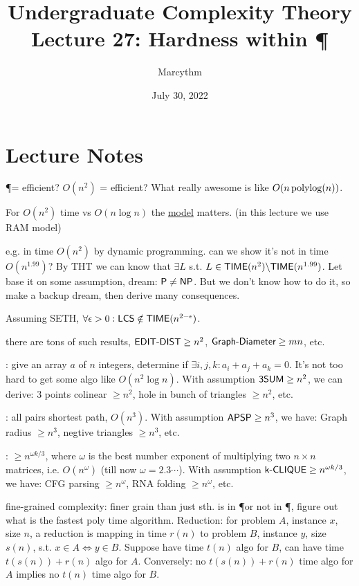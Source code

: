 \documentclass{article}
\title{Undergraduate Complexity Theory \\ Lecture 27: Hardness within \P}
\author{Marcythm}
\date{July 30, 2022}
\begin{document}
\maketitle{}

\section{Lecture Notes}

\P = efficient? \(O(n^2)\) = efficient? What really awesome is like \(O(n \operatorname{polylog}(n))\).

\begin{remark}
  For \(O(n^2)\) time vs \(O(n \log n)\) the \ul{model} matters. (in this lecture we use RAM model)
\end{remark}

e.g.  in time \(O(n^2)\) by dynamic programming. can we show it's not in time \(O(n^{1.99})\)? By THT we can know that \(\exists L\) s.t. \(L \in \text{\sf TIME}(n^2) \backslash \text{\sf TIME}(n^{1.99})\). Let base it on some assumption, dream: \(\text{\sf P} \neq \text{\sf NP}\). But we don't know how to do it, so make a backup dream, then derive many consequences.

\begin{theorem}[2010's]
  Assuming SETH, \(\forall \epsilon>0: \text{\sf LCS} \notin \text{\sf TIME}(n^{2-\epsilon})\).
\end{theorem}

there are tons of such results, \(\text{\sf EDIT-DIST} \geq n^2\), \(\text{\sf Graph-Diameter} \geq mn\), etc.

: give an array \(a\) of \(n\) integers, determine if \(\exists i, j, k: a_i + a_j + a_k = 0\). It's not too hard to get some algo like \(O(n^2 \log n)\). With assumption \(\text{\sf 3SUM} \geq n^2\), we can derive: 3 points colinear \(\geq n^2\), hole in bunch of triangles \(\geq n^2\), etc.

: all pairs shortest path, \(O(n^3)\). With assumption \(\text{\sf APSP} \geq n^3\), we have: Graph radius \(\geq n^3\), negtive triangles \(\geq n^3\), etc.

: \(\geq n^{\omega k/3}\), where \(\omega\) is the best number exponent of multiplying two \(n \times n\) matrices, i.e. \(O(n^{\omega})\) (till now \(\omega = 2.3\cdots\)). With assumption \(\text{\sf k-CLIQUE} \geq n^{\omega k/3}\), we have: CFG parsing \(\geq n^\omega\), RNA folding \(\geq n^\omega\), etc.

fine-grained complexity: finer grain than just sth. is in \P or not in \P, figure out what is the fastest poly time algorithm.
Reduction: for problem \(A\), instance \(x\), size \(n\), a reduction is mapping in time \(r(n)\) to problem \(B\), instance \(y\), size \(s(n)\), s.t. \(x \in A \iff y \in B\). Suppose have time \(t(n)\) algo for \(B\), can have time \(t(s(n)) + r(n)\) algo for \(A\). Conversely: no \(t(s(n)) + r(n)\) time algo for \(A\) implies no \(t(n)\) time algo for \(B\).
\end{document}
